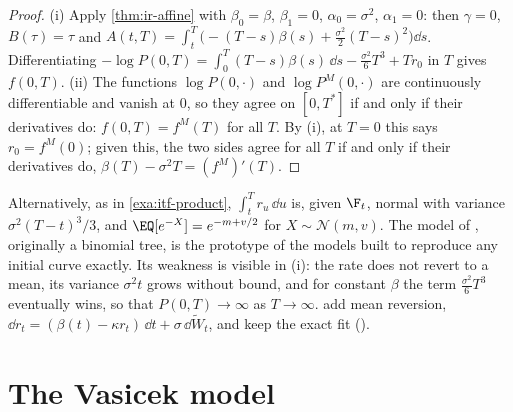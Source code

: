 \begin{proof}
(i) Apply \cref{thm:ir-affine} with $\beta_0=\beta$, $\beta_1=0$, $\alpha_0=\sigma^2$, $\alpha_1=0$: then
$\gamma=0$, $B(\tau)=\tau$ and $A(t,T)=\int_t^T\big(-(T-s)\beta(s)+\frac{\sigma^2}2(T-s)^2\big)\dd s$.
Differentiating $-\log P(0,T)=\int_0^T(T-s)\beta(s)\,\dd s-\frac{\sigma^2}6T^3+Tr_0$ in $T$ gives
$f(0,T)$. (ii) The functions $\log P(0,\cdot)$ and $\log P^M(0,\cdot)$ are continuously
differentiable and vanish at $0$, so they agree on $[0,T^*]$ if and only if their derivatives do:
$f(0,T)=f^M(T)$ for all $T$. By (i), at $T=0$ this says $r_0=f^M(0)$; given this, the two sides
agree for all $T$ if and only if their derivatives do, $\beta(T)-\sigma^2T=(f^M)'(T)$.
\end{proof}

Alternatively, as in \cref{exa:itf-product}, $\int_t^Tr_u\,\dd u$ is, given $\F_t$, normal with
variance $\sigma^2(T-t)^3/3$, and $\EQ[e^{-X}]=e^{-m+v/2}$ for $X\sim\mathcal N(m,v)$. The model of \textcite{ho-lee-1986}, originally a binomial tree, is the
prototype of the models built to reproduce any initial curve exactly. Its weakness is visible in (i): the rate does not
revert to a mean, its variance $\sigma^2t$ grows without bound, and for constant $\beta$ the term
$\frac{\sigma^2}6T^3$ eventually wins, so that $P(0,T)\to\infty$ as $T\to\infty$. 
add mean reversion, $\dd r_t=(\beta(t)-\kappa r_t)\,\dd t+\sigma\,\dd\widetilde W_t$, and keep the
exact fit ().

\section{The Vasicek model}\label{sec:ir-vasicek}

